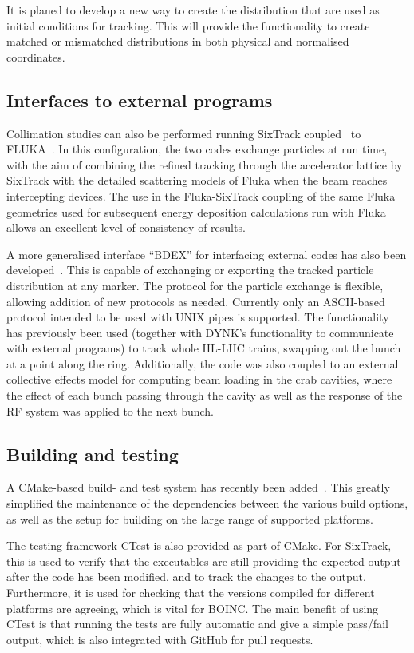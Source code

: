 \documentclass[a4paper,
              ]{jacow}
\begin{document}
It is planed to develop a new way to create the distribution that are used as initial conditions for tracking. This will provide the functionality to create matched or mismatched distributions in both physical and normalised coordinates.



\subsection{Interfaces to external programs}
Collimation studies can also be performed running SixTrack coupled~\cite{flukaCouplingVV} to FLUKA~\cite{FLUKA1,FLUKA2}. In this configuration, the two codes exchange particles at run time, with the aim of combining the refined tracking through the accelerator lattice by SixTrack with the detailed scattering models of Fluka when the beam reaches intercepting devices. The use in the Fluka-SixTrack coupling of the same Fluka geometries used for subsequent energy deposition calculations run with Fluka allows an excellent level of consistency of results.

A more generalised interface ``BDEX'' for interfacing external codes has also been developed~\cite{recentDevels2}.
This is capable of exchanging or exporting the tracked particle distribution at any marker.
The protocol for the particle exchange is flexible, allowing addition of new protocols as needed.
Currently only an ASCII-based protocol intended to be used with UNIX pipes is supported.
The functionality has previously been used (together with DYNK's functionality to communicate with external programs) to track whole HL-LHC trains, swapping out the bunch at a point along the ring.
Additionally, the code was also coupled to an external collective effects model for computing beam loading in the crab cavities, where the effect of each bunch passing through the cavity as well as the response of the RF system was applied to the next bunch.

\subsection{Building and testing}
A CMake-based build- and test system has recently been added~\cite{recentDevels2}.
This greatly simplified the maintenance of the dependencies between the various build options, as well as the setup for building on the large range of supported platforms.

The testing framework CTest is also provided as part of CMake.
For SixTrack, this is used to verify that the executables are still providing the expected output after the code has been modified, and to track the changes to the output.
Furthermore, it is used for checking that the versions compiled for different platforms are agreeing, which is vital for BOINC.
The main benefit of using CTest is that running the tests are fully automatic and give a simple pass/fail output, which is also integrated with GitHub for pull requests.
\end{document}
